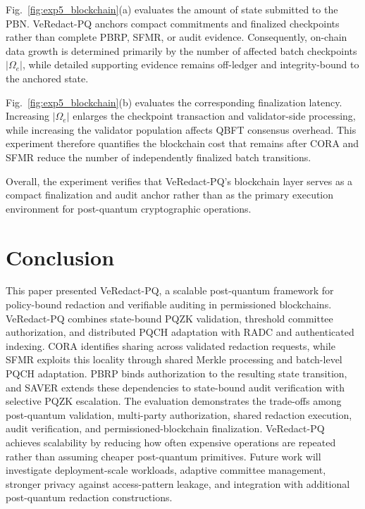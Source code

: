 \documentclass[lettersize,journal]{IEEEtran}
\begin{document}
Fig.~\ref{fig:exp5_blockchain}(a) evaluates the amount of state submitted
to the PBN. VeRedact-PQ anchors compact commitments and finalized
checkpoints rather than complete PBRP, SFMR, or audit evidence.
Consequently, on-chain data growth is determined primarily by the number
of affected batch checkpoints $|\Omega_e|$, while detailed supporting
evidence remains off-ledger and integrity-bound to the anchored state.

Fig.~\ref{fig:exp5_blockchain}(b) evaluates the corresponding
finalization latency. Increasing $|\Omega_e|$ enlarges the checkpoint
transaction and validator-side processing, while increasing the
validator population affects QBFT consensus overhead. This experiment
therefore quantifies the blockchain cost that remains after CORA and
SFMR reduce the number of independently finalized batch transitions.

Overall, the experiment verifies that VeRedact-PQ's blockchain layer
serves as a compact finalization and audit anchor rather than as the
primary execution environment for post-quantum cryptographic
operations.


\section{Conclusion}
\label{sec:conclusion}

This paper presented VeRedact-PQ, a scalable post-quantum framework
for policy-bound redaction and verifiable auditing in permissioned
blockchains. VeRedact-PQ combines state-bound PQZK validation,
threshold committee authorization, and distributed PQCH adaptation
with RADC and authenticated indexing. CORA identifies sharing across
validated redaction requests, while SFMR exploits this locality through
shared Merkle processing and batch-level PQCH adaptation. PBRP binds
authorization to the resulting state transition, and SAVER extends
these dependencies to state-bound audit verification with selective
PQZK escalation. The evaluation demonstrates the trade-offs among post-quantum
validation, multi-party authorization, shared redaction execution,
audit verification, and permissioned-blockchain finalization.
VeRedact-PQ achieves scalability by reducing how often expensive
operations are repeated rather than assuming cheaper post-quantum
primitives. Future work will investigate deployment-scale workloads,
adaptive committee management, stronger privacy against access-pattern
leakage, and integration with additional post-quantum redaction
constructions.
    
\end{document}
